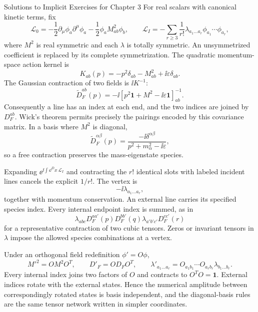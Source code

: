 \begin{bankssolutions}{Solutions to Implicit Exercises for Chapter 3}
For real scalars with canonical kinetic terms, fix
\[
 \mathcal L_0=-\frac12\partial_\mu\phi_a\partial^\mu\phi_a
 -\frac12\phi_aM^2_{ab}\phi_b,
 \qquad
 \mathcal L_I=-\sum_{r\geq3}\frac{1}{r!}
 \lambda_{a_1\ldots a_r}\phi_{a_1}\cdots\phi_{a_r},
\]
where $M^2$ is real symmetric and each $\lambda$ is totally symmetric.  An
unsymmetrized coefficient is replaced by its complete symmetrization.
The quadratic momentum-space action kernel is
\[
 K_{ab}(p)=-p^2\delta_{ab}-M^2_{ab}+\ii\varepsilon\delta_{ab}.
\]
The Gaussian contraction of two fields is $\ii K^{-1}$:
\[
 \boxed{\widetilde D_F^{ab}(p)
 =-\ii\left[p^2\mathbf1+M^2-\ii\varepsilon\mathbf1\right]^{-1}_{ab}}.
\]
Consequently a line has an index at each end, and the two indices are joined
by $D_F^{ab}$.  Wick's theorem permits precisely the pairings encoded by this
covariance matrix.  In a basis where $M^2$ is diagonal,
\[
 \widetilde D_F^{\alpha\beta}(p)
 =\frac{-\ii\delta^{\alpha\beta}}
 {p^2+m_\alpha^2-\ii\varepsilon},
\]
so a free contraction preserves the mass-eigenstate species.

Expanding $\ee^{\ii\int\dd^D x\,\mathcal L_I}$ and contracting the $r!$ identical
slots with labeled incident lines cancels the explicit $1/r!$.  The vertex is
\[
 \boxed{-\ii\lambda_{a_1\ldots a_r}},
\]
together with momentum conservation.  An external line carries its specified
species index.  Every internal endpoint index is summed, as in
\[
 \lambda_{abc}D_F^{aa'}(p)D_F^{bb'}(q)
 \lambda_{a'b'c'}D_F^{cc'}(r)
\]
for a representative contraction of two cubic tensors.  Zeros or invariant
tensors in $\lambda$ impose the allowed species combinations at a vertex.

Under an orthogonal field redefinition $\phi'=O\phi$,
\[
 M'^2=OM^2O^T,
 \qquad D'_F=OD_FO^T,
 \qquad
 \lambda'_{a_1\ldots a_r}
 =O_{a_1b_1}\cdots O_{a_rb_r}\lambda_{b_1\ldots b_r}.
\]
Every internal index joins two factors of $O$ and contracts to
$O^TO=\mathbf1$.  External indices rotate with the external states.  Hence
the numerical amplitude between correspondingly rotated states is basis
independent, and the diagonal-basis rules are the same tensor network written
in simpler coordinates.


\end{bankssolutions}
